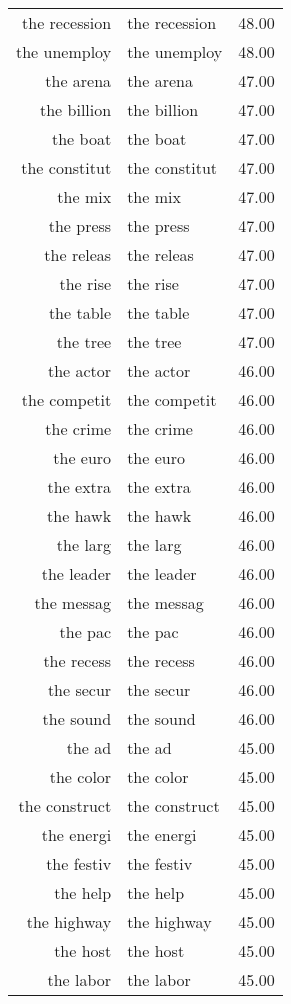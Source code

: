 \begin{table}[ht]
\begin{tabular}{rlr}
  the recession & the recession & 48.00 \\ 
  the unemploy & the unemploy & 48.00 \\ 
  the arena & the arena & 47.00 \\ 
  the billion & the billion & 47.00 \\ 
  the boat & the boat & 47.00 \\ 
  the constitut & the constitut & 47.00 \\ 
  the mix & the mix & 47.00 \\ 
  the press & the press & 47.00 \\ 
  the releas & the releas & 47.00 \\ 
  the rise & the rise & 47.00 \\ 
  the table & the table & 47.00 \\ 
  the tree & the tree & 47.00 \\ 
  the actor & the actor & 46.00 \\ 
  the competit & the competit & 46.00 \\ 
  the crime & the crime & 46.00 \\ 
  the euro & the euro & 46.00 \\ 
  the extra & the extra & 46.00 \\ 
  the hawk & the hawk & 46.00 \\ 
  the larg & the larg & 46.00 \\ 
  the leader & the leader & 46.00 \\ 
  the messag & the messag & 46.00 \\ 
  the pac & the pac & 46.00 \\ 
  the recess & the recess & 46.00 \\ 
  the secur & the secur & 46.00 \\ 
  the sound & the sound & 46.00 \\ 
  the ad & the ad & 45.00 \\ 
  the color & the color & 45.00 \\ 
  the construct & the construct & 45.00 \\ 
  the energi & the energi & 45.00 \\ 
  the festiv & the festiv & 45.00 \\ 
  the help & the help & 45.00 \\ 
  the highway & the highway & 45.00 \\ 
  the host & the host & 45.00 \\ 
  the labor & the labor & 45.00 \\ 

\end{tabular}
\end{table}
